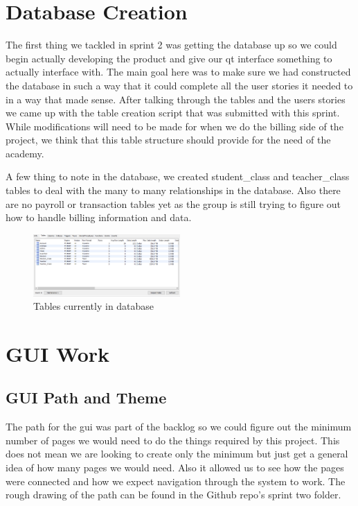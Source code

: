 \documentclass[11pt]{book}
\begin{document}
\section{Database Creation}

The first thing we tackled in sprint 2 was getting the database up so we could begin actually developing the product and give our qt interface something to actually interface with. The main goal here was to make sure we had constructed the database in such a way that it could complete all the user stories it needed to in a way that made sense. After talking through the tables and the users stories we came up with the table creation script that was submitted with this sprint. While modifications will need to be made for when we do the billing side of the project, we think that this table structure should provide for the need of the academy.

A few thing to note in the database, we created student\_class and teacher\_class tables to deal with the many to many relationships in the database. Also there are no payroll or transaction tables yet as the group is still trying to figure out how to handle billing information and data.

\begin{figure}
\caption{Tables currently in database}
\centering
\includegraphics[width=0.5\textwidth]{database_tables}
\end{figure}

\section{GUI Work}

\subsection{GUI Path and Theme}

The path for the gui was part of the backlog so we could figure out the minimum number of pages we would need to do the things required by this project. This does not mean we are looking to create only the minimum but just get a general idea of how many pages we would need. Also it allowed us to see how the pages were connected and how we expect navigation through the system to work. The rough drawing of the path can be found in the Github repo's sprint two folder.
\end{document}
